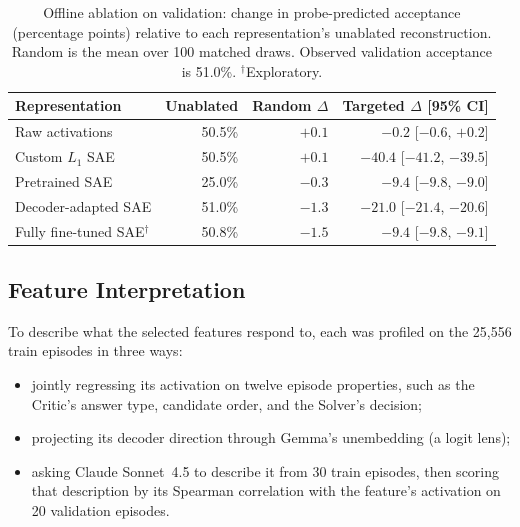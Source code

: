 \begin{table}[htbp]
    \centering
    \caption{Offline ablation on validation: change in probe-predicted
    acceptance (percentage points) relative to each representation's
    unablated reconstruction. Random is the mean over 100 matched draws.
    Observed validation acceptance is 51.0\%. $^\dagger$Exploratory.}
    \label{tab:offline-ablation}
    \begin{tabular}{lrrr}
        \toprule
        Representation & Unablated & Random $\Delta$ & Targeted $\Delta$ [95\% CI] \\
        \midrule
        Raw activations & 50.5\% & $+0.1$ & $-0.2$ [$-0.6$, $+0.2$] \\
        Custom $L_1$ SAE & 50.5\% & $+0.1$ & $-40.4$ [$-41.2$, $-39.5$] \\
        Pretrained SAE & 25.0\% & $-0.3$ & $-9.4$ [$-9.8$, $-9.0$] \\
        Decoder-adapted SAE & 51.0\% & $-1.3$ & $-21.0$ [$-21.4$, $-20.6$] \\
        Fully fine-tuned SAE$^\dagger$ & 50.8\% & $-1.5$ & $-9.4$ [$-9.8$, $-9.1$] \\
        \bottomrule
    \end{tabular}
\end{table}

\subsection{Feature Interpretation}
\label{sec:res-interpretation}

To describe what the selected features respond to, each was profiled on the
25,556 train episodes in three ways:
\begin{itemize}[nosep]
    \item jointly regressing its activation on twelve episode properties, such
    as the Critic's answer type, candidate order, and the Solver's decision;
    \item projecting its decoder direction through Gemma's unembedding (a logit
    lens);
    \item asking Claude Sonnet~4.5 to describe it from 30 train episodes, then
    scoring that description by its Spearman correlation with the feature's
    activation on 20 validation episodes.
\end{itemize}

